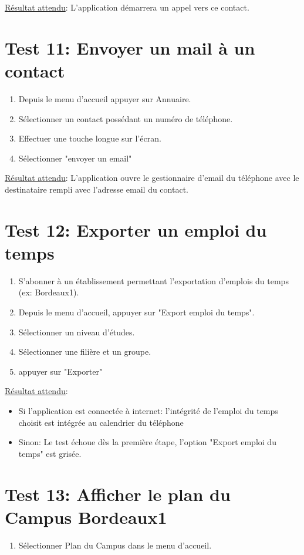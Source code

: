 \documentclass [pdftex,12pt] {report}
\begin{document}
    \underline{Résultat attendu}: L'application démarrera un appel vers ce contact.

  \section{Test 11: Envoyer un mail à un contact}
    \begin{enumerate}
    \item Depuis le menu d'accueil appuyer sur Annuaire.
    \item Sélectionner un contact possédant un numéro de téléphone.
    \item Effectuer une touche longue sur l'écran.
    \item Sélectionner "envoyer un email"
    \end{enumerate}

    \underline{Résultat attendu}: L'application ouvre le gestionnaire d'email du téléphone avec le destinataire rempli avec l'adresse email du contact.

  \section{Test 12: Exporter un emploi du temps}
    \begin{enumerate}
    \item S'abonner à un établissement permettant l'exportation d'emplois du temps (ex: Bordeaux1).
    \item Depuis le menu d'accueil, appuyer sur "Export emploi du temps".
    \item Sélectionner un niveau d'études.
    \item Sélectionner une filière et un groupe.
    \item appuyer sur "Exporter"
    \end{enumerate}

    \underline{Résultat attendu}:
    \begin{itemize}
    \item Si l'application est connectée à internet: l'intégrité de l'emploi du temps choisit est intégrée au calendrier du téléphone
    \item Sinon: Le test échoue dès la première étape, l'option "Export emploi du temps" est grisée.
    \end{itemize}

  \section{Test 13: Afficher le plan du Campus Bordeaux1}
    \begin{enumerate}
    \item Sélectionner Plan du Campus dans le menu d'accueil.
    \end{enumerate}
\end{document}
